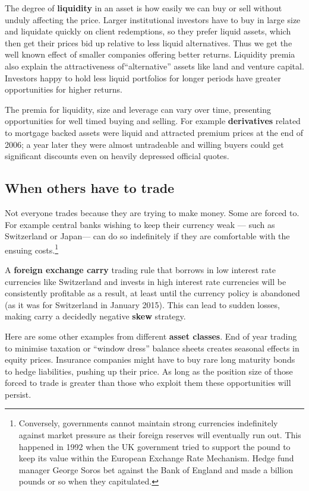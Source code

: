 The degree of \textbf{liquidity} in an asset is how easily we can buy or sell without unduly affecting the price. Larger institutional investors have to buy in large size and liquidate quickly on client redemptions, so they prefer liquid assets, which then get their prices bid up relative to less liquid alternatives. Thus we get the well known effect of smaller companies offering better returns. Liquidity premia also explain the attractiveness of``alternative'' assets like land and venture capital. Investors happy to hold less liquid portfolios for longer periods have greater opportunities for higher returns.

The premia for liquidity, size and leverage can vary over time, presenting opportunities for well timed buying and selling. For example \textbf{derivatives} related to mortgage backed assets were liquid and attracted premium prices at the end of 2006; a year later they were almost untradeable and willing buyers could get significant discounts even on heavily depressed official quotes.

\subsection*{When others have to trade}

Not everyone trades because they are trying to make money. Some are forced to. For example central banks wishing to keep their currency weak --- such as Switzerland or Japan--- can do so indefinitely if they are comfortable with the ensuing costs.\footnote{Conversely, governments cannot maintain strong currencies indefinitely against market pressure as their foreign reserves will eventually run out. This happened in 1992 when the UK government tried to support the pound to keep its value within the European Exchange Rate Mechanism. Hedge fund manager George Soros bet against the Bank of England and made a billion pounds or so when they capitulated.}

A \textbf{foreign exchange carry} trading rule that borrows in low interest rate currencies like Switzerland and invests in high interest rate currencies will be consistently profitable as a result, at least until the currency policy is abandoned (as it was for Switzerland in January 2015). This can lead to sudden losses, making carry a decidedly negative \textbf{skew} strategy.

Here are some other examples from different \textbf{asset classes}. End of year trading to minimise taxation or ``window dress'' balance sheets creates seasonal effects in equity prices. Insurance companies might have to buy rare long maturity bonds to hedge liabilities, pushing up their price. As long as the position size of those forced to trade is greater than those who exploit them these opportunities will persist.


